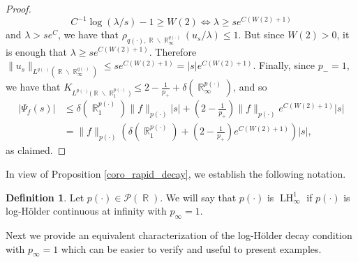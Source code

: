\documentclass[11pt,reqno]{amsart}
\theoremstyle{definition}
\theoremstyle{definition}
\theoremstyle{definition}
\newtheorem{definition}[theorem]{Definition}
\DeclareMathOperator{\R}{\mathbb{R}}
\newcommand{\p}{p(\cdot)}
\newcommand{\LH}{\operatorname{LH}_\infty^1}
\begin{document}
\begin{proof}
\begin{equation*}
C^{-1}\log(\lambda/s)-1\geq W(2)\iff \lambda\geq se^{C(W(2)+1)}
   \end{equation*}
   and $\lambda> se^{C}$, we have that $  \rho_{q(\cdot),\R\backslash\R_{\infty}^{q(\cdot)}}(u_s/\lambda)\leq 1$. But since $W(2)>0$, it is enough that $\lambda \geq se^{C(W(2)+1)}$.
   Therefore  $\|u_s\|_{{L^{q(\cdot)}(\R\backslash\R_{\infty}^{q(\cdot)})}}\leq se^{C(W(2)+1)}=|s|e^{C(W(2)+1)}$. Finally, since $p_{-}=1$, we have that $  K_{L^{\p}({\R\backslash\R^{\p}_1)}}\leq2-\frac{1}{p_{+}}+\delta\left(\R_{\infty}^{\p}\right)$, and so
   \begin{align*}
       |\Psi_f(s)|&\leq \delta\left(\R^{\p}_1\right)\|f\|_{\p}|s|+\left(2-\frac{1}{p_{+}}\right)\|f\|_{p(\cdot)}e^{C(W(2)+1)}|s|\\
       &= \|f\|_{\p}\left(\delta\left(\R^{\p}_1\right)+\left(2-\frac{1}{p_{+}}\right)e^{C(W(2)+1)}\right)|s|,
   \end{align*}
   as claimed.
\end{proof}
In view of Proposition \ref{coro_rapid_decay}, we establish the following notation.
\begin{definition}
    Let $\p\in\mathcal{P}(\R)$. We will say that $\p$ is $\LH$ if $\p$ is log-Hölder continuous at infinity with $p_\infty=1$.
\end{definition}

Next we provide an equivalent characterization of the log-Hölder decay condition with $p_\infty=1$ which can be easier to verify and useful to present examples.
\end{document}
